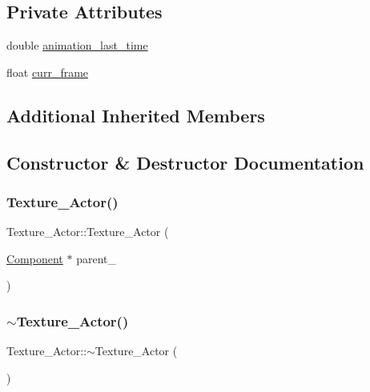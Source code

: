 \subsection*{Private Attributes}
\begin{DoxyCompactItemize}
\item 
double \hyperlink{classTexture__Actor_ade94d84772d24743144108f40746bf3d}{animation\+\_\+last\+\_\+time}
\item 
float \hyperlink{classTexture__Actor_a53fa0809792b2afdf41f0cad391a4cbf}{curr\+\_\+frame}
\end{DoxyCompactItemize}
\subsection*{Additional Inherited Members}


\subsection{Constructor \& Destructor Documentation}
\mbox{\label{classTexture__Actor_aa3fa337dfab146ebf9fd1f10fdf156f3}} 
\subsubsection{\texorpdfstring{Texture\+\_\+\+Actor()}{Texture\_Actor()}}
{\footnotesize\ttfamily Texture\+\_\+\+Actor\+::\+Texture\+\_\+\+Actor (\begin{DoxyParamCaption}\item[{\hyperlink{classComponent}{Component} $\ast$}]{parent\+\_\+ }\end{DoxyParamCaption})}

\mbox{\label{classTexture__Actor_ae1426bad44e2d168a5016807acbcbb7e}} 
\subsubsection{\texorpdfstring{$\sim$\+Texture\+\_\+\+Actor()}{~Texture\_Actor()}}
{\footnotesize\ttfamily Texture\+\_\+\+Actor\+::$\sim$\+Texture\+\_\+\+Actor (\begin{DoxyParamCaption}{ }\end{DoxyParamCaption})}



